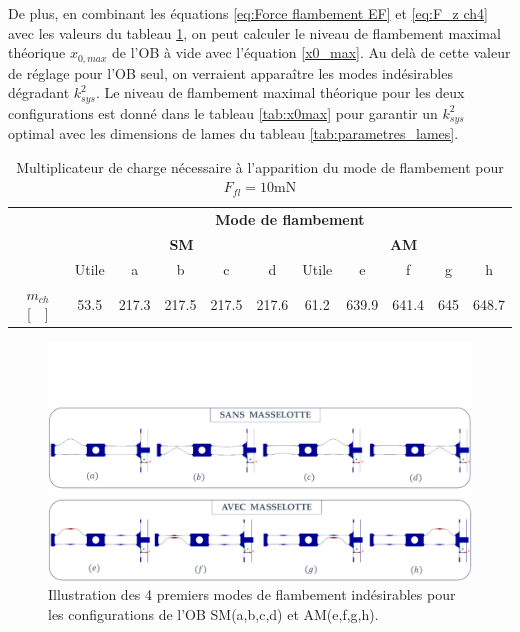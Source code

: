 De plus, en combinant les équations \ref{eq:Force flambement EF} et \ref{eq:F_z ch4} avec les valeurs du tableau \ref{tab:multiplicateur_de_charge_flambement}, on peut calculer le niveau de flambement maximal théorique $x_{0,max}$ de l'OB à vide avec l'équation \ref{x0_max}. Au delà de cette valeur de réglage pour l'OB seul, on verraient apparaître les modes indésirables dégradant $k_{sys}^2$. Le niveau de flambement maximal théorique pour les deux configurations est donné dans le tableau \ref{tab:x0max} pour garantir un $k_{sys}^2$ optimal avec les dimensions de lames du tableau \ref{tab:parametres_lames}.
\begin{table}[!htbp]
	\centering
		\begin{tabular}[t]{c|c|c|c|c|c|c|c|c|c|c|}
\cline{2-11} 
& \multicolumn{10}{c|}{\textbf{Mode de flambement}}\\
\cline{2-11} 
& \multicolumn{5}{c|}{\textbf{SM}} &  \multicolumn{5}{c|}{\textbf{AM}} \\
\cline{2-11} 
& Utile & a & b & c & d & Utile & e & f & g & h \\
\cline{2-11} \hline
\multicolumn{1}{|c|}{$m_{ch}$ [~~]} &
53.5 & 217.3	&	217.5	&	217.5	&	217.6	&
61.2 & 639.9	&	641.4	&	645		&	648.7 \\
\hline
		\end{tabular}
        \caption{Multiplicateur de charge nécessaire à l'apparition du mode de flambement pour $F_{fl} = 10$mN}
        \label{tab:multiplicateur_de_charge_flambement}
\end{table}        
\begin{figure}[!htbp]
\begin{center}
    \captionsetup{justification=centering}
	\includegraphics[trim={0cm 0cm 0cm 5cm},clip, width=\textwidth]{../Chap3/Figure/EF_flambement_avec_et_sans_masselotte.pdf}
	\caption{Illustration des 4 premiers modes de flambement indésirables pour les configurations de l'OB SM(a,b,c,d) et AM(e,f,g,h).}
	\label{fig:EF_flambement_avec_et_sans_masselotte}
\end{center}
\end{figure}
